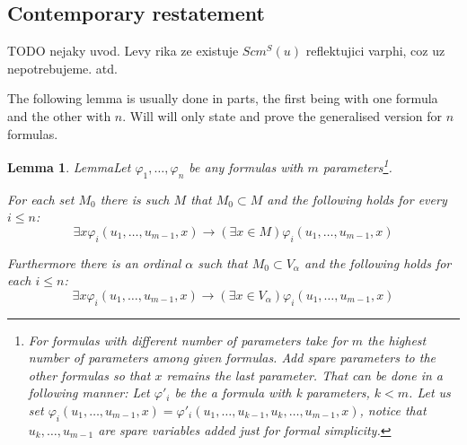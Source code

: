 \documentclass[12pt,a4paper]{article}
\newtheorem{lemma}[theorem]{Lemma}
\newcommand{\then}{\rightarrow}
\newcommand{\bce}{\begin{compactenum}}
\newcommand{\ece}{\end{compactenum}}
\begin{document}
\subsection{Contemporary restatement}
TODO nejaky uvod. Levy rika ze existuje $Scm^S(u)$ reflektujici varphi, coz uz nepotrebujeme. atd.
\medskip

The following lemma is usually done in parts, the first being with one formula and the other with $n$. Will will only state and prove the generalised version for $n$ formulas.
\begin{lemma}{Lemma}\label{lemma:reflection_lemma}
Let $\varphi_1, \ldots, \varphi_n$ be any formulas with $m$ parameters\footnote{For formulas with different number of parameters take for $m$ the highest number of parameters among given formulas. Add spare parameters to the other formulas so that $x$ remains the last parameter. That can be done in a following manner: Let $\varphi'_i$ be the a formula with k parameters, $k < m$. Let us set $\varphi_i(u_1, \ldots, u_{m-1}, x) = \varphi'_i(u_1, \ldots, u_{k-1}, u_k, \ldots, u_{m-1}, x)$, notice that $u_k, \ldots, u_{m-1}$ are spare variables added just for formal simplicity.}. 
\bce[(i)]
\item For each set $M_0$ there is such $M$ that $M_0 \subset M$ and the following holds for every $i \leq n$:
\begin{equation}
\exists x \varphi_i(u_1, \ldots, u_{m-1}, x) \then (\exists x \in M) \varphi_i(u_1, \ldots, u_{m-1}, x)
\end{equation}

\item Furthermore there is an ordinal $\alpha$ such that $M_0 \subset V_\alpha$ and the following holds for each $i \leq n$:
\begin{equation}
\exists x \varphi_i(u_1, \ldots, u_{m-1}, x) \then (\exists x \in V_\alpha) \varphi_i(u_1, \ldots, u_{m-1}, x)
\end{equation}
\ece
\end{lemma}
\end{document}
